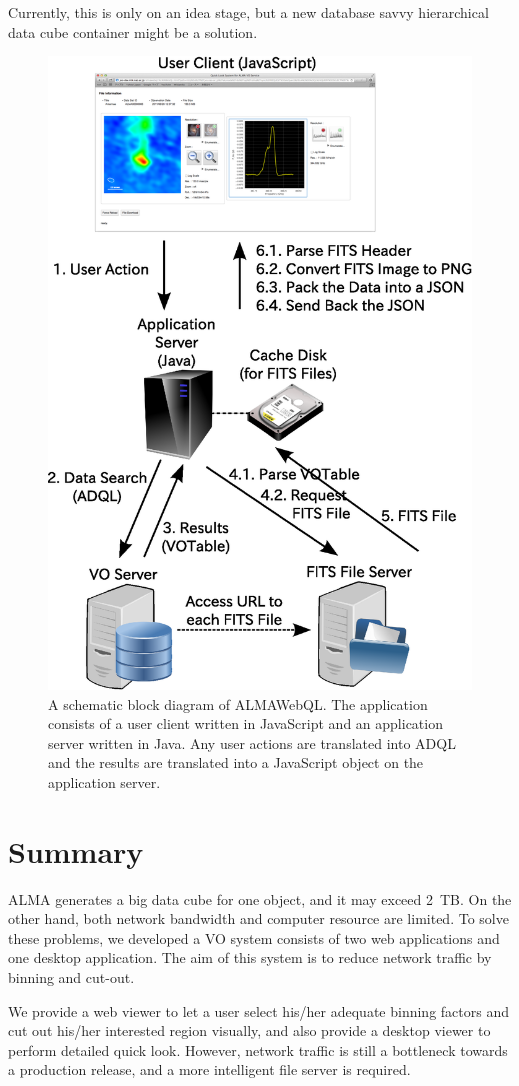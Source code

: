 \documentclass[11pt,twoside]{article}
\begin{document}
Currently, this is only on an idea stage, but a new database savvy hierarchical data
cube container might be a solution.


\begin{figure}[tbh]
	\begin{center}
		\includegraphics[keepaspectratio,width=0.54\hsize,clip]{O10_f3.eps}
	\end{center}
	\caption{A schematic block diagram of ALMAWebQL. The application consists of
	a user client written in JavaScript and an application server written in Java. Any user actions
	are translated into ADQL and the results are translated into a JavaScript object on the application
	server.\label{O10_f3}}
\end{figure}%

\section{Summary}

ALMA generates a big data cube for one object, and it may exceed 2\ TB.
On the other hand, both network bandwidth and computer resource are limited.
To solve these problems, we developed a VO system consists of two web applications
and one desktop application.
The aim of this system is to reduce network traffic by binning and cut-out.

We provide a web viewer to let a user select his/her adequate binning factors
and cut out his/her interested region visually, and also provide a desktop viewer
to perform detailed quick look.
However, network traffic is still a bottleneck towards a production release,
and a more intelligent file server is required.





\end{document}
